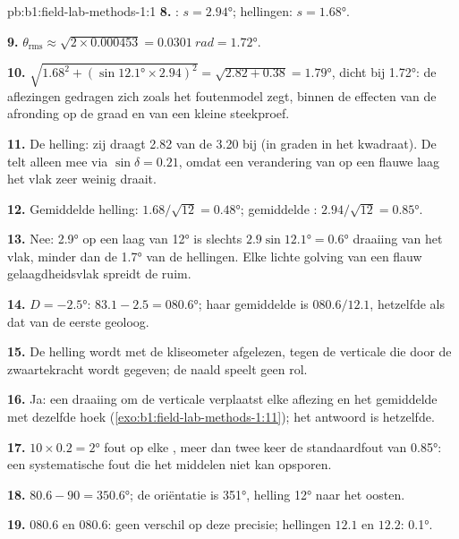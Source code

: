 \begin{solution}{pb:b1:field-lab-methods-1:1}
\textbf{8.} : $s = \ang{2.94}$; hellingen: $s = \ang{1.68}$.

\textbf{9.} $\theta_{\text{rms}} \approx \sqrt{2\times0.000453} =
\qty{0.0301}{rad} = \ang{1.72}$.

\textbf{10.} $\sqrt{1.68^2 + (\sin\ang{12.1}\times2.94)^2} = \sqrt{2.82 +
0.38} = \ang{1.79}$, dicht bij \ang{1.72}: de aflezingen gedragen zich zoals het foutenmodel zegt, binnen de
effecten van de afronding op de graad en van een kleine steekproef.

\textbf{11.} De helling: zij draagt 2.82 van de 3.20 bij (in graden in het kwadraat). De  telt
alleen mee via $\sin\delta = 0.21$, omdat een verandering van  op een flauwe laag het vlak zeer weinig draait.

\textbf{12.} Gemiddelde helling: $1.68/\sqrt{12} = \ang{0.48}$; gemiddelde :
$2.94/\sqrt{12} = \ang{0.85}$.

\textbf{13.} Nee: \ang{2.9}  op een laag van \ang{12} is slechts
$2.9\sin\ang{12.1} = \ang{0.6}$ draaiing van het vlak, minder dan de \ang{1.7} van de hellingen. Elke lichte golving
van een flauw gelaagdheidsvlak spreidt de  ruim.

\textbf{14.} $D = \ang{-2.5}$: $83.1 - 2.5 = \ang{080.6}$; haar gemiddelde is
$080.6/12.1$, hetzelfde als dat van de eerste geoloog.

\textbf{15.} De helling wordt met de kliseometer afgelezen, tegen de verticale die door de zwaartekracht wordt
gegeven; de naald speelt geen rol.

\textbf{16.} Ja: een draaiing om de verticale verplaatst elke aflezing en het gemiddelde met dezelfde hoek
(\cref{exo:b1:field-lab-methods-1:11}); het antwoord is hetzelfde.

\textbf{17.} $10\times0.2 = \ang{2}$ fout op elke , meer dan twee keer de standaardfout van \ang{0.85}:
een systematische fout die het middelen niet kan opsporen.

\textbf{18.} $80.6 - 90 = \ang{350.6}$; de oriëntatie is  \ang{351}, helling \ang{12} naar het oosten.

\textbf{19.}  $080.6$ en $080.6$: geen verschil op deze precisie; hellingen $12.1$ en $12.2$: \ang{0.1}.


\end{solution}

